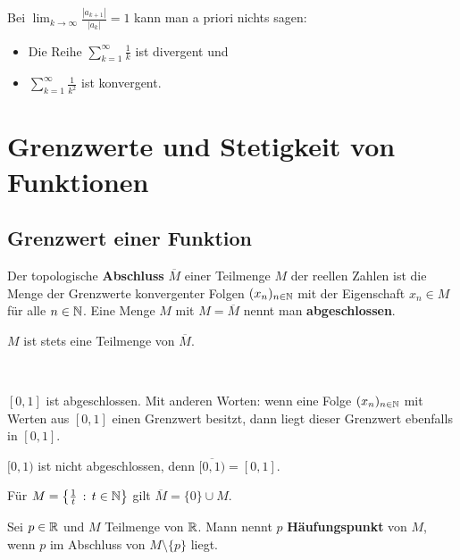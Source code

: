 \begin{bem}
	Bei $\lim_{k \to \infty} \frac{|a_{k+1}|}{|a_k|} =1$ kann man a priori nichts sagen: 
	\begin{itemize}
		\item[] Die Reihe $\sum_{k=1}^\infty \frac{1}{k}$ ist divergent und 
		\item[] $\sum_{k=1}^\infty \frac{1}{k^2}$ ist konvergent. 
	\end{itemize} 
\end{bem} 

\chapter{Grenzwerte und Stetigkeit von Funktionen} 

\section{Grenzwert einer Funktion} 

\begin{defn}
	Der topologische \textbf{Abschluss} $\overline{M}$ einer Teilmenge $M$ der reellen Zahlen ist die Menge der Grenzwerte konvergenter Folgen $(x_n)_{n \in \mathbb{N}}$ mit der Eigenschaft $x_n \in M$ für alle $n \in \mathbb{N}$. Eine Menge $M$ mit $M = \overline{M}$ nennt man \textbf{abgeschlossen}. 
\end{defn} 

\begin{bem} 
	$M$ ist stets eine Teilmenge von $\overline{M}$. 
\end{bem} 

\begin{bsp} {\ }
	\begin{enuma} 
		\item $[0,1]$ ist abgeschlossen. Mit anderen Worten: wenn eine Folge $(x_n)_{n \in \mathbb{N}}$ mit Werten aus $[0,1]$ einen Grenzwert besitzt, dann liegt dieser Grenzwert ebenfalls in $[0,1]$.  
		\item $[0,1)$ ist nicht abgeschlossen, denn $\overline{[0,1)} = [0,1]$. 
		\item Für $M = \left\{  \frac{1}{t}  \,:\, t \in \mathbb{N} \right\}$ gilt $\overline{M} = \{0\} \cup M$. 
	\end{enuma} 
\end{bsp} 

\begin{defn}
	Sei $p \in \mathbb{R}$ und $M$ Teilmenge von $\mathbb{R}$. Mann nennt $p$ \textbf{Häufungspunkt} von $M$, wenn $p$ im Abschluss von $M \setminus \{p\}$ liegt. 
\end{defn} 

